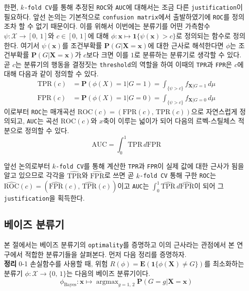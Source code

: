 \documentclass[11pt,onecolumn,twoside,a4size]{gsag3jnl}
\DeclareMathOperator*{\argmax}{argmax}
\begin{document}
한편, \texttt{$k$-fold CV}를 통해 추정된 \texttt{ROC}와 \texttt{AUC}에 대해서는 조금 다른 \texttt{justification}이 필요하다. 앞선 논의는 기본적으로 \texttt{confusion matrix}에서 출발하였기에 \texttt{ROC}를 정의조차 할 수 없기 때문이다. 이를 위해서 이번에는 분류기를 어떤 가측함수 $\psi:\mathcal{X}\to[0,\,1]$와 $c\in[0,\,1]$에 대해 $\phi:\mathbf{x}\mapsto\mathbf{1}\{\psi(\mathbf{x})>c\}$로 정의되는 함수로 정의한다. 여기서 $\psi(\mathbf{x})$를 조건부확률 $\mathbf{P}(G\vert \mathbf{X}=\mathbf{x})$에 대한 근사로 해석한다면 $\phi$는 조건부확률 $\mathbf{P}(G\vert \mathbf{X}=\mathbf{x})$가 $c$보다 크면 이를 $1$로 분류하는 분류기로 생각할 수 있다. 곧 $c$는 분류기의 행동을 결정짓는 \texttt{threshold}의 역할을 하여 이때의 \texttt{TPR}과 \texttt{FPR}은 $c$에 대해 다음과 같이 정의할 수 있다.
\begin{align}
  \mathrm{TPR}(c)&=\mathbf{P}(\phi(X)=1\vert G=1)=\int_{\{\psi>c\}} f_{\mathbf{X}\vert G=1}\,d\mu\\
  \mathrm{FPR}(c)&=\mathbf{P}(\phi(X)=1\vert G=0)=\int_{\{\psi>c\}} f_{\mathbf{X}\vert G=0}\,d\mu
\end{align}
이로부터 \texttt{ROC}는 매개곡선 $\mathrm{ROC}(c)=(\mathrm{FPR}(c),\,\mathrm{TPR}(c))$으로 자연스럽게 정의되고, \texttt{AUC}는 곡선 $\mathrm{ROC}(c)$와 $x$축이 이루는 넓이가 되어 다음의 르벡-스틸체스 적분으로 정의할 수 있다.
\begin{equation}
  \mathrm{AUC}=\int_0^1\mathrm{TPR}\,d\mathrm{FPR}
\end{equation}

앞선 논의로부터 \texttt{$k$-fold CV}를 통해 계산한 \texttt{TPR}과 \texttt{FPR}이 실제 값에 대한 근사가 됨을 알고 있으므로 각각을 $\widehat{\mathrm{TPR}}$와 $\widehat{\mathrm{FPR}}$로 쓰면 곧 \texttt{$k$-fold CV} 통해 구한 \texttt{ROC}는 $\widehat{\mathrm{ROC}}(c)=(\widehat{\mathrm{FPR}}(c),\,\widehat{\mathrm{TPR}}(c))$이고 \texttt{AUC}는 $\int_0^1\widehat{\mathrm{TPR}}\,d\widehat{\mathrm{FPR}}$이 되어 그 \texttt{justification}을 획득한다.

\subsection{베이즈 분류기}

본 절에서는 베이즈 분류기의 \texttt{optimality}를 증명하고 이의 근사라는 관점에서 본 연구에서 적합한 분류기들을 살펴본다. 먼저 다음 정리를 증명하자.\\

\noindent\textsf{\textbf{정리} 0-1 손실함수를 사용할 때, 위험 $R(\phi)=\mathbf{E}(\mathbf{1}\{\phi(\mathbf{X})\ne G\})$를 최소화하는 분류기 $\phi:\mathcal{X}\to\{0,\,1\}$는 다음의 베이즈 분류기이다.
\begin{equation}\label{eq:Bayes}
  \phi_\mathrm{Bayes}:\mathbf{x}\mapsto\argmax_{g=1,\,2}\mathbf{P}(G=g\vert\mathbf{X}=\mathbf{x})
\end{equation}}
\end{document}
